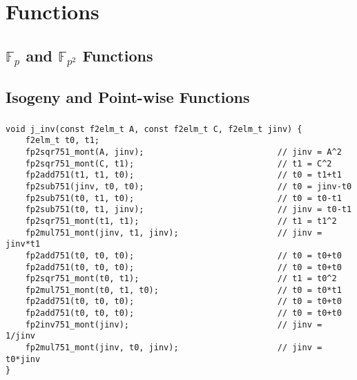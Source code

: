 \chapter{\sidh Functions}
\label{app:functions}

\section{$\mathbb{F}_p$ and $\mathbb{F}_{p^2}$ Functions}

\section{Isogeny and Point-wise Functions}

\subsection{}

\begin{lstlisting}
void j_inv(const f2elm_t A, const f2elm_t C, f2elm_t jinv) {
	f2elm_t t0, t1;
	fp2sqr751_mont(A, jinv);                           // jinv = A^2        
	fp2sqr751_mont(C, t1);                             // t1 = C^2
	fp2add751(t1, t1, t0);                             // t0 = t1+t1
	fp2sub751(jinv, t0, t0);                           // t0 = jinv-t0
	fp2sub751(t0, t1, t0);                             // t0 = t0-t1
	fp2sub751(t0, t1, jinv);                           // jinv = t0-t1
	fp2sqr751_mont(t1, t1);                            // t1 = t1^2
	fp2mul751_mont(jinv, t1, jinv);                    // jinv = jinv*t1
	fp2add751(t0, t0, t0);                             // t0 = t0+t0
	fp2add751(t0, t0, t0);                             // t0 = t0+t0
	fp2sqr751_mont(t0, t1);                            // t1 = t0^2
	fp2mul751_mont(t0, t1, t0);                        // t0 = t0*t1
	fp2add751(t0, t0, t0);                             // t0 = t0+t0
	fp2add751(t0, t0, t0);                             // t0 = t0+t0
	fp2inv751_mont(jinv);                              // jinv = 1/jinv
	fp2mul751_mont(jinv, t0, jinv);                    // jinv = t0*jinv
}
\end{lstlisting}

\subsection{}

